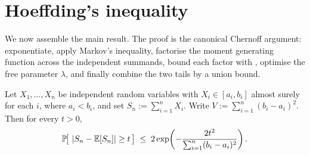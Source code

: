 \section{Hoeffding's inequality}
\label{sec:hoeffding-theorem}

We now assemble the main result. The proof is the canonical Chernoff argument:
exponentiate, apply Markov's inequality, factorise the moment generating
function across the independent summands, bound each factor with
, optimise the free parameter $\lambda$, and finally combine
the two tails by a union bound.

\begin{theorem}\label{thm:hoeffding}
Let $X_1, \ldots, X_n$ be independent random variables with $X_i \in [a_i, b_i]$
almost surely for each $i$, where $a_i < b_i$, and set $S_n := \sum_{i=1}^n X_i$.
Write $V := \sum_{i=1}^n (b_i - a_i)^2$. Then for every $t > 0$,
\begin{align}\label{eq:hoeffding-main}
\mathbb{P}\!\big[\, \left| S_n - \mathbb{E}[S_n] \right| \ge t \,\big]
\;\le\; 2 \exp\!\left( - \frac{2 t^2}{\sum_{i=1}^n (b_i - a_i)^2} \right).
\end{align}
\end{theorem}


